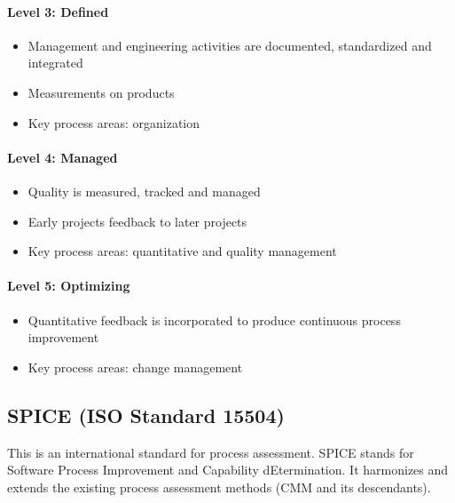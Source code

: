 \paragraph{Level 3: Defined}
\begin{itemize}
    \item Management and engineering activities are documented, standardized and integrated
    \item Measurements on products
    \item Key process areas: organization
\end{itemize}

\paragraph{Level 4: Managed}
\begin{itemize}
    \item Quality is measured, tracked and managed
    \item Early projects feedback to later projects
    \item Key process areas: quantitative and quality management
\end{itemize}

\paragraph{Level 5: Optimizing}
\begin{itemize}
    \item Quantitative feedback is incorporated to produce continuous process improvement
    \item Key process areas: change management
\end{itemize}

\subsection{SPICE (ISO Standard 15504)}

This is an international standard for process assessment. SPICE stands for
Software Process Improvement and Capability dEtermination. It harmonizes and extends the existing process assessment methods (CMM and its
descendants).\newline

